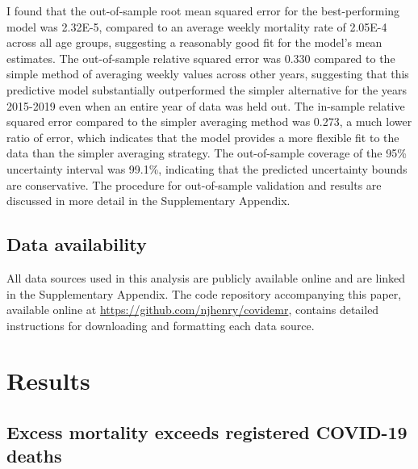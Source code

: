 \documentclass[
]{article}
\begin{document}
I found that the out-of-sample root mean squared error for the best-performing model was 2.32E-5, compared to an average weekly mortality rate of 2.05E-4 across all age groups, suggesting a reasonably good fit for the model's mean estimates. The out-of-sample relative squared error was 0.330 compared to the simple method of averaging weekly values across other years, suggesting that this predictive model substantially outperformed the simpler alternative for the years 2015-2019 even when an entire year of data was held out. The in-sample relative squared error compared to the simpler averaging method was 0.273, a much lower ratio of error, which indicates that the model provides a more flexible fit to the data than the simpler averaging strategy. The out-of-sample coverage of the 95\% uncertainty interval was 99.1\%, indicating that the predicted uncertainty bounds are conservative. The procedure for out-of-sample validation and results are discussed in more detail in the Supplementary Appendix.

\hypertarget{data-availability}{%
\subsection{Data availability}\label{data-availability}}

All data sources used in this analysis are publicly available online and are linked in the Supplementary Appendix. The code repository accompanying this paper, available online at \url{https://github.com/njhenry/covidemr}, contains detailed instructions for downloading and formatting each data source.

\hypertarget{results}{%
\section{Results}\label{results}}

\hypertarget{excess-mortality-exceeds-registered-covid-19-deaths}{%
\subsection{Excess mortality exceeds registered COVID-19 deaths}\label{excess-mortality-exceeds-registered-covid-19-deaths}}
\end{document}
